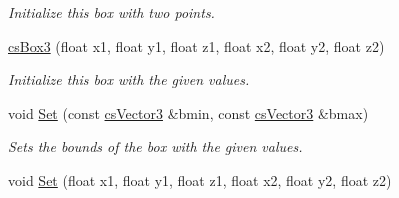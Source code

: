 \begin{DoxyCompactItemize}
\begin{DoxyCompactList}\small\item\em Initialize this box with two points. \end{DoxyCompactList}\item 
\hyperlink{classcsBox3_afdfeab82d5b2bd4730515ebd964f1280}{cs\+Box3} (float x1, float y1, float z1, float x2, float y2, float z2)\hypertarget{classcsBox3_afdfeab82d5b2bd4730515ebd964f1280}{}\label{classcsBox3_afdfeab82d5b2bd4730515ebd964f1280}

\begin{DoxyCompactList}\small\item\em Initialize this box with the given values. \end{DoxyCompactList}\item 
void \hyperlink{classcsBox3_a5d2a0176797feec906f6d37849861f02}{Set} (const \hyperlink{classcsVector3}{cs\+Vector3} \&bmin, const \hyperlink{classcsVector3}{cs\+Vector3} \&bmax)\hypertarget{classcsBox3_a5d2a0176797feec906f6d37849861f02}{}\label{classcsBox3_a5d2a0176797feec906f6d37849861f02}

\begin{DoxyCompactList}\small\item\em Sets the bounds of the box with the given values. \end{DoxyCompactList}\item 
void \hyperlink{classcsBox3_add1fd1473a613636e920f0659b2fd22b}{Set} (float x1, float y1, float z1, float x2, float y2, float z2)\hypertarget{classcsBox3_add1fd1473a613636e920f0659b2fd22b}{}\label{classcsBox3_add1fd1473a613636e920f0659b2fd22b}


\end{DoxyCompactItemize}

